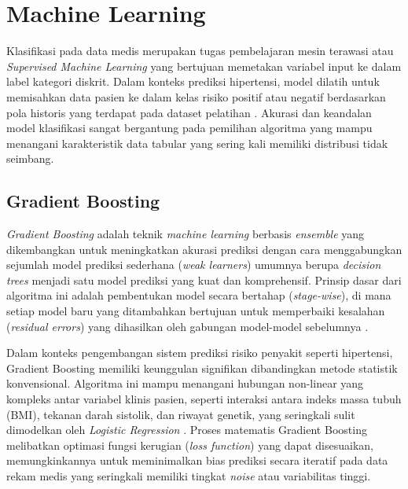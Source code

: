 \section{Machine Learning}
Klasifikasi pada data medis merupakan tugas pembelajaran mesin terawasi atau \textit{Supervised Machine Learning} yang bertujuan memetakan variabel input ke dalam label kategori diskrit. Dalam konteks prediksi hipertensi, model dilatih untuk memisahkan data pasien ke dalam kelas risiko positif atau negatif berdasarkan pola historis yang terdapat pada dataset pelatihan \parencite{Sarkar2020Machine}. Akurasi dan keandalan model klasifikasi sangat bergantung pada pemilihan algoritma yang mampu menangani karakteristik data tabular yang sering kali memiliki distribusi tidak seimbang.

\subsection{Gradient Boosting}
\textit{Gradient Boosting} adalah teknik \textit{machine learning} berbasis \textit{ensemble} yang dikembangkan untuk meningkatkan akurasi prediksi dengan cara menggabungkan sejumlah model prediksi sederhana (\textit{weak learners}) umumnya berupa \textit{decision trees} menjadi satu model prediksi yang kuat dan komprehensif. Prinsip dasar dari algoritma ini adalah pembentukan model secara bertahap (\textit{stage-wise}), di mana setiap model baru yang ditambahkan bertujuan untuk memperbaiki kesalahan (\textit{residual errors}) yang dihasilkan oleh gabungan model-model sebelumnya \parencite{Guo2024Gradient}.

Dalam konteks pengembangan sistem prediksi risiko penyakit seperti hipertensi, Gradient Boosting memiliki keunggulan signifikan dibandingkan metode statistik konvensional. Algoritma ini mampu menangani hubungan non-linear yang kompleks antar variabel klinis pasien, seperti interaksi antara indeks massa tubuh (BMI), tekanan darah sistolik, dan riwayat genetik, yang seringkali sulit dimodelkan oleh \textit{Logistic Regression} \parencite{Muftisany2024Perbandingan}. Proses matematis Gradient Boosting melibatkan optimasi fungsi kerugian (\textit{loss function}) yang dapat disesuaikan, memungkinkannya untuk meminimalkan bias prediksi secara iteratif pada data rekam medis yang seringkali memiliki tingkat \textit{noise} atau variabilitas tinggi.

